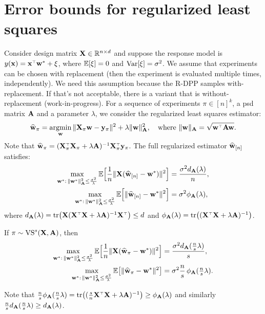 \documentclass[12pt]{sty/colt2019/colt2018-arxiv}
\begin{document}
\section{Error bounds for regularized least squares}
Consider design matrix $\mathbf X\in\mathbb R^{n\times d}$ and suppose the response
model is $y(\x)=\x^\top\w^* + \xi$, where $\mathbb E[\xi]=0$ and $\mathrm{Var}[\xi]=\sigma^2$. We assume that experiments can be chosen
with replacement (then the experiment is evaluated multiple times,
independently). We need this assumption because the R-DPP samples
with-replacement. If that's not acceptable, there is a variant that is
without-replacement (work-in-progress).  For a sequence of experiments
$\pi\in[n]^k$, a psd matrix $\mathbf A$ and a parameter $\lambda$, we consider the regularized
least squares estimator:
\begin{align*}
\wbh_\pi = \argmin_\w\|\X_\pi\w-\y_\pi\|^2 + \lambda\|\w\|_\A^2,\quad
  \text{where }\|\w\|_\A=\sqrt{\w^\top\A\w}.
\end{align*}
Note that $\wbh_\pi = (\X_\pi^\top\X_\pi +
\lambda\A)^{-1}\X_\pi^\top\y_\pi$. The full regularized estimator $\widehat{\mathbf w}_{[n]}$ satisfies:
\begin{align*}
\max_{\mathbf w^*:\,\|\mathbf w^*\|_\mathbf A^2\leq \frac{\sigma^2}{\lambda}}
  \mathbb E\Big[\frac1n\|\mathbf X(\widehat{\mathbf w}_{[n]}-\mathbf w^*)\|^2\Big]
  &=\frac{\sigma^2d_\mathbf A(\lambda)}{n},
\\ \max_{\mathbf w^*:\,\|\mathbf w^*\|_\mathbf A^2\leq \frac{\sigma^2}{\lambda}}
  \mathbb E\Big[\|\widehat{\mathbf w}_{[n]}-\mathbf w^*\|^2\Big]
&=\sigma^2\phi_\mathbf A(\lambda),
\end{align*}
where $d_\A(\lambda) =
  \tr\big(\X(\X^\top\X+\lambda\A)^{-1}\X^\top\big)\leq d$ and $\phi_\A(\lambda)=\tr\big((\X^\top\X+\lambda\A)^{-1}\big)$.
\begin{theorem}
  If $\pi\sim{\mathrm{VS}}^s(\mathbf X,\mathbf A)$, then
  \begin{align*}
    \max_{\mathbf w^*:\,\|\mathbf w^*\|_\mathbf A^2\leq \frac{\sigma^2}{\lambda}}
    \mathbb E\Big[\frac1n\|\mathbf X(\widehat{\mathbf w}_\pi-\mathbf w^*)\|^2\Big]
    &=
      \frac{\sigma^2d_\mathbf A(\frac ns\lambda)}{s},
    \\
\max_{\mathbf w^*:\,\|\mathbf w^*\|_\mathbf A^2\leq \frac{\sigma^2}{\lambda}}\mathbb E\big[\|\widehat{\mathbf w}_\pi-\mathbf w^*\|^2\big]
    &=\sigma^2\frac ns\,\phi_\mathbf A(\tfrac ns\lambda).
  \end{align*}
\end{theorem}
Note that $\frac ns\phi_\A(\frac ns\lambda) =\tr\big((\frac
sn\X^\top\X+\lambda\A)^{-1}\big)\geq \phi_\A(\lambda)$ and similarly
$\frac ns d_\mathbf A(\frac ns\lambda)\geq d_\mathbf A(\lambda)$.
\end{document}
